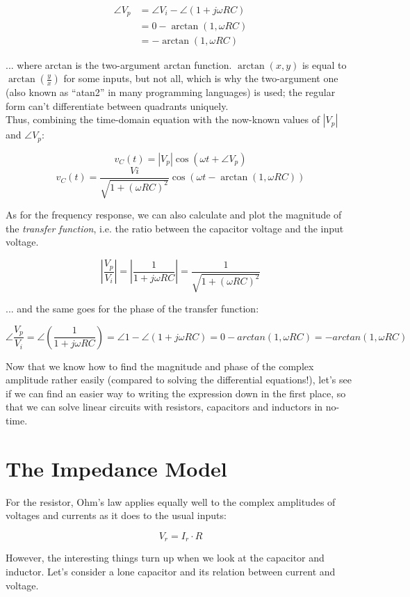 \documentclass[12pt,a4paper]{report}
\begin{document}
\begin{align*}
  \angle V_p &= \angle V_i - \angle (1 + j \omega R C) \\ 
  &= 0 - \arctan{(1, \omega R C)} \\
  &= -\arctan{(1, \omega R C)}
\end{align*}

... where arctan is the two-argument arctan function. $\arctan{(x, y)}$ is equal to $\displaystyle \arctan{(\frac{y}{x})}$ for some inputs, but not all, which is why the two-argument one (also known as ``atan2'' in many programming languages) is used; the regular form can't differentiate between quadrants uniquely.\\

Thus, combining the time-domain equation with the now-known values of $|V_p|$ and $\angle V_p$:

\[ v_C(t) = \left| V_p \right| \cos{(\omega t + \angle V_p)} \]
\[ v_C(t) = \frac{Vi}{\sqrt{1 + (\omega R C)^2}} \cos{(\omega t - \arctan{(1, \omega R C)} )} \]

As for the frequency response, we can also calculate and plot the magnitude of the \emph{transfer function}, i.e. the ratio between the capacitor voltage and the input voltage.

\[ \left| \frac{V_p}{V_i} \right| = \left| \frac{1}{1 + j \omega R C} \right| = \frac{1}{\sqrt{1 + (\omega R C)^2}} \]

... and the same goes for the phase of the transfer function:

\[ \angle \frac{V_p}{V_i} = \angle \left( \frac{1}{1 + j \omega R C} \right) = \angle 1 - \angle (1 + j \omega R C) = 0 - arctan(1, \omega R C) = -arctan(1, \omega R C) \] 

Now that we know how to find the magnitude and phase of the complex amplitude rather easily (compared to solving the differential equations!), let's see if we can find an easier way to writing the expression down in the first place, so that we can solve linear circuits with resistors, capacitors and inductors in no-time.

\section{The Impedance Model}
For the resistor, Ohm's law applies equally well to the complex amplitudes of voltages and currents as it does to the usual inputs:

\[ V_r = I_r \cdot R \]

However, the interesting things turn up when we look at the capacitor and inductor. Let's consider a lone capacitor and its relation between current and voltage.\\
\end{document}
